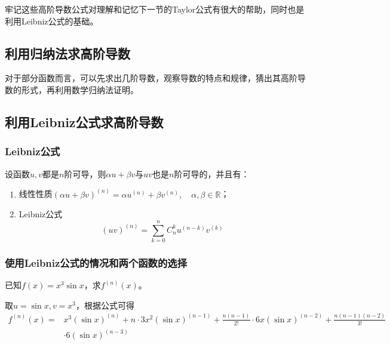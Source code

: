 \begin{remark}
	牢记这些高阶导数公式对理解和记忆下一节的Taylor公式有很大的帮助，同时也是利用Leibniz公式的基础。
\end{remark}

\subsection{利用归纳法求高阶导数}

对于部分函数而言，可以先求出几阶导数，观察导数的特点和规律，猜出其高阶导数的形式，再利用数学归纳法证明。

\subsection{利用Leibniz公式求高阶导数}\label{sec:2.9.2}

\subsubsection{Leibniz公式}

设函数$u,v$都是$n$阶可导，则$\alpha u+\beta v$与$uv$也是$n$阶可导的，并且有：

\begin{enumerate}
	\item 线性性质\quad $(\alpha u+\beta v)^{(n)}=\alpha u^{(n)}+\beta v^{(n)},\quad \alpha,\beta\in{\mathbb{R}}$；
	\item Leibniz公式
	\begin{equation}
		(uv)^{(n)}=\sum^n_{k=0}C^k_nu^{(n-k)}v^{(k)}\label{eq:2.11}
	\end{equation}
\end{enumerate}

\subsubsection{使用Leibniz公式的情况和两个函数的选择}

\begin{example}
	已知$f(x)=x^3\sin{x}$，求$f^{(n)}(x)$。
	
	取$u=\sin{x},v=x^3$，根据公式可得
	\begin{align*}
		f^{(n)}(x)=&x^3(\sin{x})^{(n)}+n\cdot 3x^2(\sin{x})^{(n-1)}+\frac{n(n-1)}{2!}\cdot 6x(\sin{x})^{(n-2)}+\frac{n(n-1)(n-2)}{3!}\\
		&\cdot 6(\sin{x})^{(n-3)}
	\end{align*}
\end{example}

